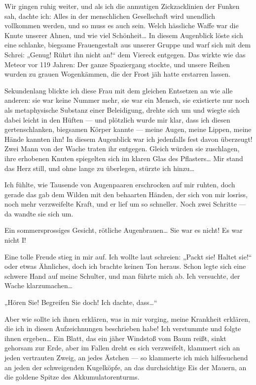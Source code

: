 Wir gingen ruhig weiter, und als ich die anmutigen Zickzacklinien
der Funken sah, dachte ich: Alles in der menschlichen Gesellschaft
wird unendlich vollkommen werden, und so muss es auch sein. Welch
hässliche Waffe war die Knute unserer Ahnen, und wie viel
Schönheit\ldots{}
%
In diesem Augenblick löste sich eine schlanke,
biegsame Frauengestalt aus unserer Gruppe und warf sich mit dem
Schrei: „Genug! Rührt ihn nicht an!“ dem Viereck entgegen. Das
wirkte wie das Meteor vor 119 Jahren: Der ganze Spaziergang
stockte, und unsere Reihen wurden zu grauen Wogenkämmen, die der
Frost jäh hatte erstarren lassen.

Sekundenlang blickte ich diese Frau mit dem gleichen Entsetzen an
wie alle anderen: sie war keine Nummer mehr, sie war ein Mensch,
sie existierte nur noch als metaphysische Substanz einer
Beleidigung, drehte sich um und wiegte sich dabei leicht in den
Hüften — und plötzlich wurde mir klar, dass ich diesen
gertenschlanken, biegsamen Körper kannte — meine Augen, meine
Lippen, meine Hände kannten ihn! In diesem Augenblick war
ich jedenfalls fest davon überzeugt! Zwei Mann von der Wache traten
ihr entgegen. Gleich würden sie zuschlagen, ihre erhobenen Knuten
spiegelten sich im klaren Glas des Pflasters\ldots{} Mir stand das Herz
still, und ohne lange zu überlegen, stürzte ich hinzu\ldots{}

Ich fühlte, wie Tausende von Augenpaaren erschrocken auf mir
ruhten, doch gerade das gab dem Wilden mit den behaarten Händen,
der sich von mir losriss, noch mehr verzweifelte Kraft, und er lief
um so schneller. Noch zwei Schritte — da wandte sie sich um.

Ein
sommersprossiges Gesicht, rötliche Augenbrauen\ldots{} Sie war es nicht!
Es war nicht I!

Eine tolle Freude stieg in mir auf. Ich wollte laut schreien:
„Packt sie! Haltet sie!“ oder etwas Ähnliches, doch ich brachte
keinen Ton heraus. Schon legte sich eine schwere Hand auf meine
Schulter, und man führte mich ab. Ich versuchte, der Wache
klarzumachen\ldots{}

„Hören Sie! Begreifen Sie doch! Ich dachte, dass\ldots{}“

Aber wie sollte ich ihnen erklären, was in mir vorging,
meine Krankheit erklären, die ich in diesen Aufzeichnungen
beschrieben habe! Ich verstummte und folgte ihnen ergeben\ldots{} Ein
Blatt, das ein jäher Windstoß vom Baum reißt, sinkt gehorsam zur
Erde, aber im Fallen dreht es sich verzweifelt, klammert sich an
jeden vertrauten Zweig, an jedes Ästchen — so klammerte ich mich
hilfesuchend an jeden der schweigenden Kugelköpfe, an das
durchsichtige Eis der Mauern, an die goldene Spitze des
Akkumulatorenturms.

